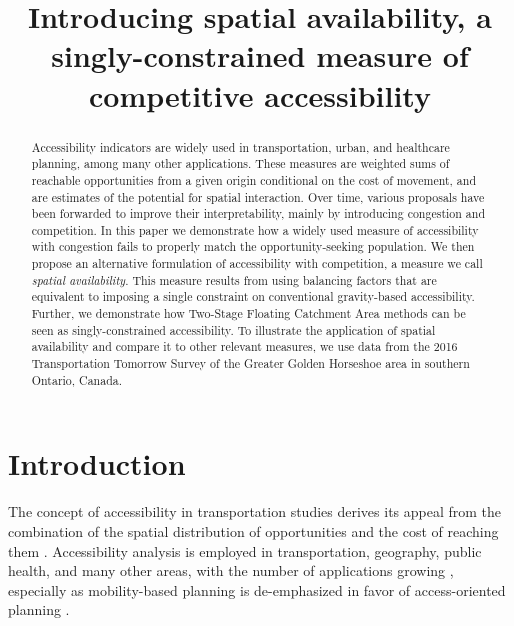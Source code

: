 \documentclass[]{elsarticle} %
\begin{document}
\begin{frontmatter}

  \title{Introducing spatial availability, a singly-constrained measure
of competitive accessibility}
  
  \begin{abstract}
  Accessibility indicators are widely used in transportation, urban, and
  healthcare planning, among many other applications. These measures are
  weighted sums of reachable opportunities from a given origin
  conditional on the cost of movement, and are estimates of the
  potential for spatial interaction. Over time, various proposals have
  been forwarded to improve their interpretability, mainly by
  introducing congestion and competition. In this paper we demonstrate
  how a widely used measure of accessibility with congestion fails to
  properly match the opportunity-seeking population. We then propose an
  alternative formulation of accessibility with competition, a measure
  we call \emph{spatial availability}. This measure results from using
  balancing factors that are equivalent to imposing a single constraint
  on conventional gravity-based accessibility. Further, we demonstrate
  how Two-Stage Floating Catchment Area methods can be seen as
  singly-constrained accessibility. To illustrate the application of
  spatial availability and compare it to other relevant measures, we use
  data from the 2016 Transportation Tomorrow Survey of the Greater
  Golden Horseshoe area in southern Ontario, Canada.
  \end{abstract}
  
 \end{frontmatter}

\newpage

\hypertarget{sec:introduction}{%
\section{Introduction}\label{sec:introduction}}

The concept of accessibility in transportation studies derives its
appeal from the combination of the spatial distribution of opportunities
and the cost of reaching them \citep{hansen1959, handy_measuring_1997}.
Accessibility analysis is employed in transportation, geography, public
health, and many other areas, with the number of applications growing
\citep{shi_literature_2020}, especially as mobility-based planning is
de-emphasized in favor of access-oriented planning
\citep{deboosere2018, handy2020, proffitt2017, yan2021}.
\end{document}
